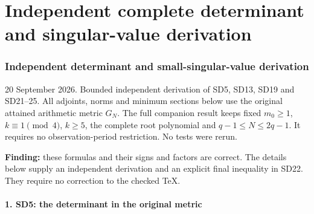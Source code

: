 \endgroup

\clearpage\begingroup
\part*{Independent complete determinant and singular-value derivation}
\providecommand{\osdindtightlist}{\setlength{\itemsep}{0pt}\setlength{\parskip}{0pt}}

\section{Independent determinant and small-singular-value derivation}\label{osdind:independent-determinant-and-small-singular-value-derivation}

20 September 2026. Bounded independent derivation of SD5, SD13, SD19 and SD21--25. All adjoints, norms and minimum sections below use the original attained arithmetic metric \(G_N\). The full companion result keeps fixed \(m_0\ge1\), \(k\equiv1\pmod4\), \(k\ge5\), the complete root polynomial and \(q-1\le N\le2q-1\). It requires no observation-period restriction. No tests were rerun.

\textbf{Finding:} these formulas and their signs and factors are correct. The details below supply an independent derivation and an explicit final inequality in SD22. They require no correction to the checked TeX.

\subsection{1. SD5: the determinant in the original metric}\label{osdind:sd5-the-determinant-in-the-original-metric}

